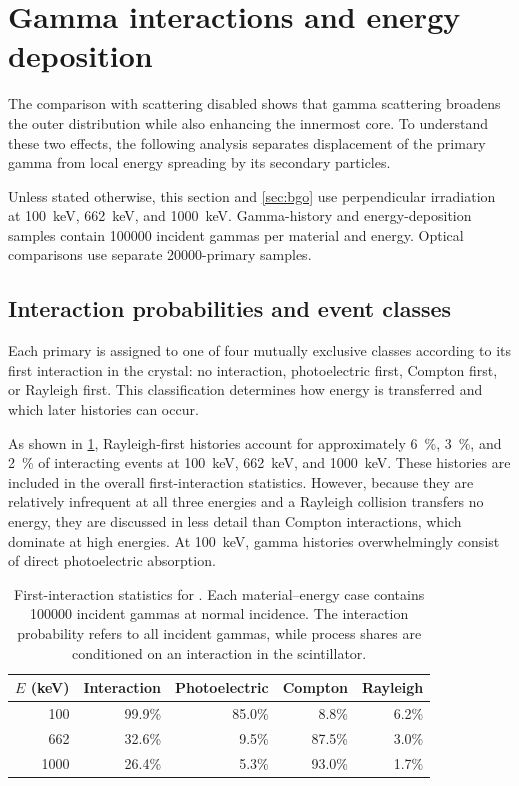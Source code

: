 \section{Gamma interactions and energy deposition}
\label{sec:interactions}

The comparison with scattering disabled shows that gamma scattering broadens the outer distribution while also enhancing the innermost core. To understand these two effects, the following analysis separates displacement of the primary gamma from local energy spreading by its secondary particles.

Unless stated otherwise, this section and \cref{sec:bgo} use perpendicular irradiation at \qty{100}{\kilo\electronvolt}, \qty{662}{\kilo\electronvolt}, and \qty{1000}{\kilo\electronvolt}. Gamma-history and energy-deposition samples contain \num{100000} incident gammas per material and energy. Optical comparisons use separate \num{20000}-primary samples.


\subsection{Interaction probabilities and event classes}

Each primary is assigned to one of four mutually exclusive classes according to its first interaction in the crystal: no interaction, photoelectric first, Compton first, or Rayleigh first. This classification determines how energy is transferred and which later histories can occur.

As shown in \cref{tab:cebr-first-interactions}, Rayleigh-first histories account for approximately \qty{6}{\percent}, \qty{3}{\percent}, and \qty{2}{\percent} of interacting  events at \qty{100}{\kilo\electronvolt}, \qty{662}{\kilo\electronvolt}, and \qty{1000}{\kilo\electronvolt}. These histories are included in the overall first-interaction statistics. However, because they are relatively infrequent at all three energies and a Rayleigh collision transfers no energy, they are discussed in less detail than Compton interactions, which dominate at high energies. At \qty{100}{\kilo\electronvolt}, gamma histories overwhelmingly consist of direct photoelectric absorption.

\begin{table}[htbp]
\centering\small
\caption{First-interaction statistics for . Each material--energy case contains \num{100000} incident gammas at normal incidence. The interaction probability refers to all incident gammas, while process shares are conditioned on an interaction in the scintillator.}
\label{tab:cebr-first-interactions}
\begin{tabular}{rrrrr}
\toprule
$E$ (\unit{\kilo\electronvolt}) & Interaction & Photoelectric & Compton & Rayleigh \\
\midrule
100 & 99.9\% & 85.0\% & 8.8\% & 6.2\% \\
662 & 32.6\% & 9.5\% & 87.5\% & 3.0\% \\
1000 & 26.4\% & 5.3\% & 93.0\% & 1.7\% \\
\bottomrule
\end{tabular}
\end{table}

